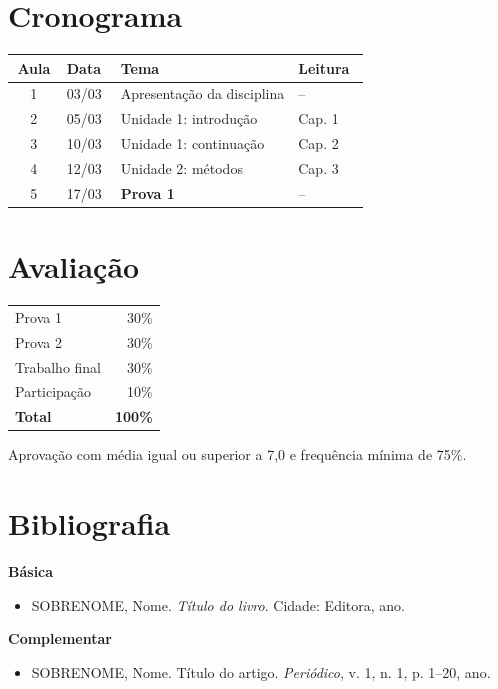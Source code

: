 \documentclass[11pt,a4paper]{article}
\begin{document}
\section{Cronograma}
\begin{longtable}{@{}c l p{0.5\linewidth} l@{}}
  \toprule
  Aula & Data & Tema & Leitura \\
  \midrule
  \endhead
  1 & 03/03 & Apresentação da disciplina & -- \\
  2 & 05/03 & Unidade 1: introdução & Cap. 1 \\
  3 & 10/03 & Unidade 1: continuação & Cap. 2 \\
  4 & 12/03 & Unidade 2: métodos & Cap. 3 \\
  5 & 17/03 & \textbf{Prova 1} & -- \\
  \bottomrule
\end{longtable}

\section{Avaliação}
\begin{tabular}{@{}lr@{}}
  Prova 1 & 30\% \\
  Prova 2 & 30\% \\
  Trabalho final & 30\% \\
  Participação & 10\% \\
  \midrule
  \textbf{Total} & \textbf{100\%} \\
\end{tabular}

Aprovação com média igual ou superior a 7,0 e frequência mínima de 75\%.

\section{Bibliografia}
\textbf{Básica}
\begin{itemize}
  \item SOBRENOME, Nome. \textit{Título do livro}. Cidade: Editora, ano.
\end{itemize}
\textbf{Complementar}
\begin{itemize}
  \item SOBRENOME, Nome. Título do artigo. \textit{Periódico}, v. 1, n. 1, p. 1--20, ano.
\end{itemize}
\end{document}
